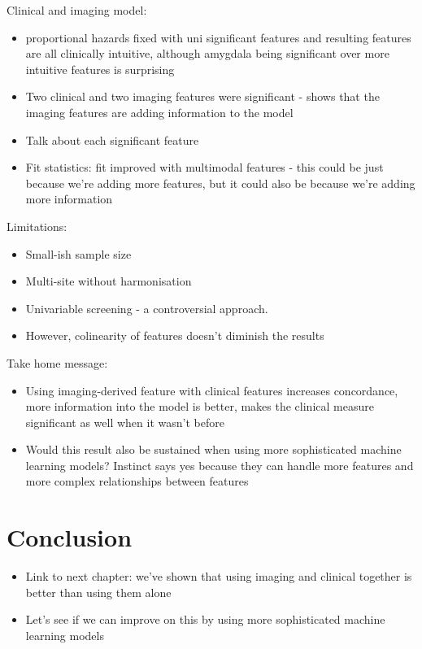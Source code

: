 Clinical and imaging model:
\begin{itemize}
    \item proportional hazards fixed with uni significant features and resulting features are all clinically intuitive, although amygdala being significant over more intuitive features is surprising
    \item Two clinical and two imaging features were significant - shows that the imaging features are adding information to the model
    \item Talk about each significant feature
    \item Fit statistics: fit improved with multimodal features - this could be just because we're adding more features, but it could also be because we're adding more information
\end{itemize}

Limitations:
\begin{itemize}
    \item Small-ish sample size
    \item Multi-site without harmonisation
    \item Univariable screening - a controversial approach.
    \item However, colinearity of features doesn't diminish the results
\end{itemize}

Take home message:
\begin{itemize}
    \item Using imaging-derived feature with clinical features increases concordance, more information into the model is better, makes the clinical measure significant as well when it wasn't before
    \item Would this result also be sustained when using more sophisticated machine learning models? Instinct says yes because they can handle more features and more complex relationships between features
\end{itemize}

\section{Conclusion}
\begin{itemize}
    \item Link to next chapter: we've shown that using imaging and clinical together is better than using them alone
    \item Let's see if we can improve on this by using more sophisticated machine learning models
\end{itemize}